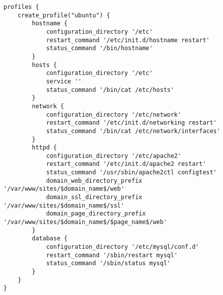 \begin{lstlisting}[style=Java, caption=Beispiel Profil Ubuntu Server]
profiles {
    create_profile("ubuntu") {
        hostname {
            configuration_directory '/etc'
            restart_command '/etc/init.d/hostname restart'
            status_command '/bin/hostname'
        }
        hosts {
            configuration_directory '/etc'
            service ''
            status_command '/bin/cat /etc/hosts'
        }
        network {
            configuration_directory '/etc/network'
            restart_command '/etc/init.d/networking restart'
            status_command '/bin/cat /etc/network/interfaces'
        }
        httpd {
            configuration_directory '/etc/apache2'
            restart_command '/etc/init.d/apache2 restart'
            status_command '/usr/sbin/apache2ctl configtest'
            domain_web_directory_prefix '/var/www/sites/$domain_name$/web'
            domain_ssl_directory_prefix '/var/www/sites/$domain_name$/ssl'
            domain_page_directory_prefix '/var/www/sites/$domain_name$/$page_name$/web'
        }
        database {
            configuration_directory '/etc/mysql/conf.d'
            restart_command '/sbin/restart mysql'
            status_command '/sbin/status mysql'
        }
    }
}
\end{lstlisting}

